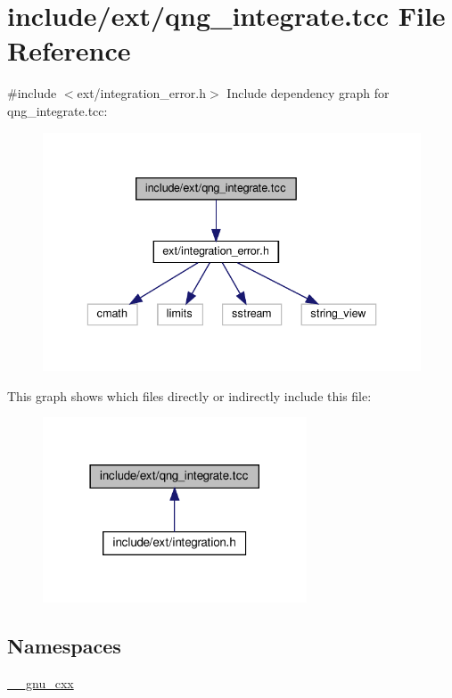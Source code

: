 \hypertarget{qng__integrate_8tcc}{}\section{include/ext/qng\+\_\+integrate.tcc File Reference}
\label{qng__integrate_8tcc}
{\ttfamily \#include $<$ext/integration\+\_\+error.\+h$>$}\newline
Include dependency graph for qng\+\_\+integrate.\+tcc\+:
\nopagebreak
\begin{figure}[H]
\begin{center}
\leavevmode
\includegraphics[width=336pt]{qng__integrate_8tcc__incl}
\end{center}
\end{figure}
This graph shows which files directly or indirectly include this file\+:
\nopagebreak
\begin{figure}[H]
\begin{center}
\leavevmode
\includegraphics[width=222pt]{qng__integrate_8tcc__dep__incl}
\end{center}
\end{figure}
\subsection*{Namespaces}
\begin{DoxyCompactItemize}
\item 
 \hyperlink{namespace____gnu__cxx}{\+\_\+\+\_\+gnu\+\_\+cxx}
\end{DoxyCompactItemize}
